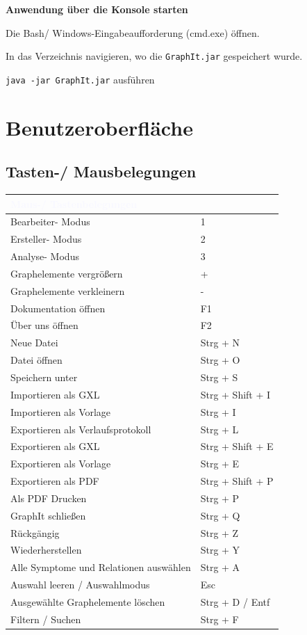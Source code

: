 \documentclass[enabledeprecatedfontcommands,fontsize=11pt,paper=a4,twoside]{scrartcl}
\newcounter{one}
\newcounter{two}[one]
\let\tempone\itemize
\let\temptwo\enditemize
\renewenvironment{itemize}{\tempone\addtolength{\itemsep}{-10.0pt}}{\temptwo}
\begin{document}
\textbf{Anwendung über die Konsole starten}
\begin{itemize}
	\item Die Bash/ Windows-Eingabeaufforderung (cmd.exe) öffnen.
	\item In das Verzeichnis navigieren, wo die \texttt{GraphIt.jar} gespeichert wurde. 
	\item \texttt{java -jar GraphIt.jar} ausführen
\end{itemize}
\newpage	
\section{Benutzeroberfläche}
\subsection{Tasten-/ Mausbelegungen}

\begin{tabular} {|p{8cm}|p{8cm}|}
	\hline
	\rowcolor{glaucous}\multicolumn{2}{|l|} {\parbox{16cm}{\textbf{\textcolor{ghostwhite}{Maus-/ Tastenbelegungen}}} } \\ \hline\hline 	
	Bearbeiter- Modus & 1 \\ \hline
	Ersteller- Modus & 2 \\ \hline
	Analyse- Modus & 3 \\ \hline
	Graphelemente vergrößern & + \\ \hline
	Graphelemente verkleinern & - \\ \hline 
	Dokumentation öffnen & F1 \\ \hline 
	\glqq Über uns \grqq{} öffnen & F2 \\ \hline 
	Neue Datei	& Strg + N \\ \hline
	Datei öffnen & Strg + O \\ \hline
	Speichern unter	&	Strg + S \\ \hline
	Importieren als GXL & Strg + Shift + I \\ \hline
	Importieren als Vorlage & Strg + I \\ \hline
	Exportieren als Verlaufsprotokoll & Strg + L \\ \hline 
	Exportieren als GXL & Strg + Shift + E \\ \hline
	Exportieren als Vorlage & Strg + E \\ \hline
	Exportieren als PDF & Strg + Shift + P \\ \hline
	Als PDF Drucken	& Strg + P \\ \hline
	GraphIt schließen & Strg + Q \\ \hline 
	Rückgängig 	& Strg + Z \\ \hline 
	Wiederherstellen & Strg + Y \\ \hline 
	Alle Symptome und Relationen auswählen & Strg + A \\ \hline 
	Auswahl leeren / Auswahlmodus & Esc	\\ \hline
	Ausgewählte Graphelemente löschen & Strg + D / Entf \\ \hline 
	Filtern / Suchen	& Strg + F \\ \hline 
\end{tabular}
\end{document}
